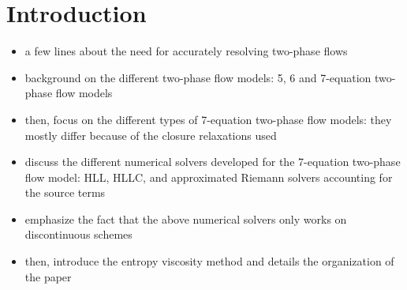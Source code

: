 \documentclass[preprint,10pt]{elsarticle}
\begin{document}
\section{Introduction}\label{sec:intro}
\begin{itemize}
\item a few lines about the need for accurately resolving two-phase flows
\item background on the different two-phase flow models: 5, 6 and 7-equation two-phase flow models
\item then, focus on the different types of 7-equation two-phase flow models: they mostly differ because of the closure relaxations used
\item discuss the different numerical solvers developed for the 7-equation two-phase flow model: HLL, HLLC, and approximated Riemann solvers accounting for the source terms
\item emphasize the fact that the above numerical solvers only works on discontinuous schemes
\item then, introduce the entropy viscosity method and details the organization of the paper 
\end{itemize}
%
\end{document}
